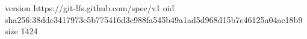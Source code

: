 version https://git-lfs.github.com/spec/v1
oid sha256:38ddc3417973c5b775416d3e988fa545b49a1ad5d968d15b7c46125a04ae18b9
size 1424
